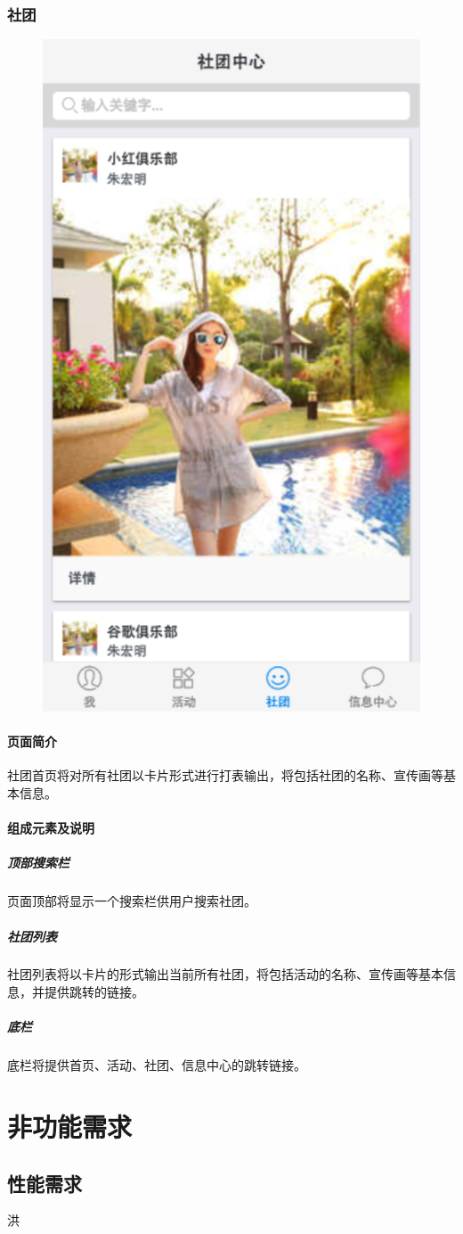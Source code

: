 \documentclass[UTF8]{ctexart}
\begin{document}
\subsubsection{社团}
\begin{figure}[H]
\centering
\includegraphics[width = .5\textwidth]{tong-club-home.png}
\end{figure}
\paragraph{页面简介}
社团首页将对所有社团以卡片形式进行打表输出，将包括社团的名称、宣传画等基本信息。

\paragraph{组成元素及说明}
\subparagraph*{顶部搜索栏}
页面顶部将显示一个搜索栏供用户搜索社团。
\subparagraph*{社团列表}
社团列表将以卡片的形式输出当前所有社团，将包括活动的名称、宣传画等基本信息，并提供跳转的链接。
\subparagraph*{底栏}
底栏将提供首页、活动、社团、信息中心的跳转链接。

\section{非功能需求}
\subsection{性能需求}
洪
\end{document}
